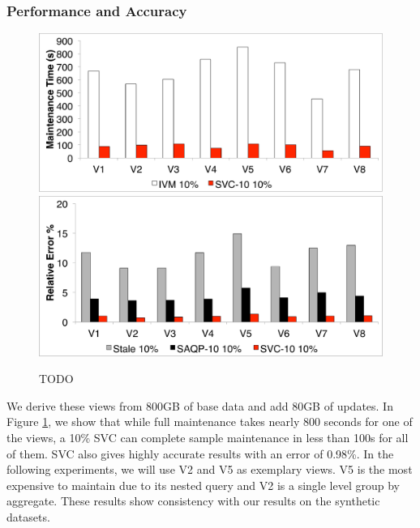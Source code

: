 \subsubsection{Performance and Accuracy}
\begin{figure}[t]
\centering
 \includegraphics[scale=0.14]{exp/con_2.pdf}
 \includegraphics[scale=0.14]{exp/con_1.pdf}
 \caption{TODO \label{conv-1}}
\end{figure}
We derive these views from 800GB of base data and add 80GB of updates.
In Figure \ref{conv-1}, we show that while full maintenance takes nearly 800 seconds for one of the views, a 10\% SVC can complete sample maintenance in less than 100s for all of them.
SVC also gives highly accurate results with an error of 0.98\%.
In the following experiments, we will use V2 and V5 as exemplary views.
V5 is the most expensive to maintain due to its nested query and V2 is a single level group by aggregate.
These results show consistency with our results on the synthetic datasets.

